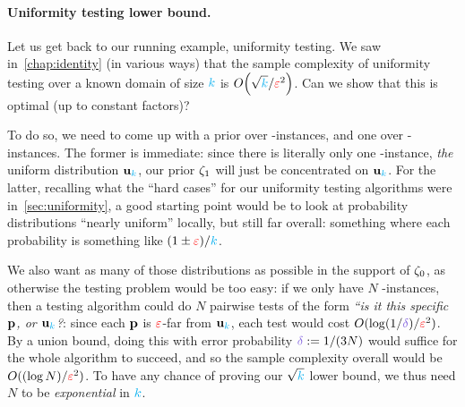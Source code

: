 \paragraph{Uniformity testing lower bound.} Let us get back to our running example, uniformity testing. We saw  in~\cref{chap:identity} (in various ways) that the sample complexity of uniformity testing over a known domain of size ${\textcolor{cyan}{k}}$ is $\bigO{\sqrt{\ab}/\dst^2}$. Can we show that this is optimal (up to constant factors)?

To do so, we need to come up with a prior over \yes-instances, and one over \no-instances. The former is immediate: since there is literally only one \yes-instance, \emph{the} uniform distribution $\mathbf{u}_{\textcolor{cyan}{k}}$, our prior $\zeta_1$ will just be concentrated on $\mathbf{u}_{\textcolor{cyan}{k}}$. For the latter, recalling what the ``hard cases'' for our uniformity testing algorithms were in~\cref{sec:uniformity}, a good starting point would be to look at probability distributions ``nearly uniform'' locally, but still far overall: something where each probability is something like $(1\pm\textcolor{red}{\varepsilon})/{\textcolor{cyan}{k}}$. 

We also want as many of those distributions as possible in the support of $\zeta_0$, as otherwise the testing problem would be too easy: if we only have $N$ \no-instances, then a testing algorithm could do $N$ pairwise tests of the form \emph{``is it this specific $\mathbf{p}$, or $\mathbf{u}_{\textcolor{cyan}{k}}$?}: since each $\mathbf{p}$ is $\textcolor{red}{\varepsilon}$-far from $\mathbf{u}_{\textcolor{cyan}{k}}$, each test would cost $O(\log(1/\errprob)/\dst^2)$. By a union bound, doing this with error probability $\errprob \eqdef 1/(3N)$ would suffice for the whole algorithm to succeed, and so the sample complexity overall would be $O((\log N)/\textcolor{red}{\varepsilon}^2)$. To have any chance of proving our $\sqrt{{\textcolor{cyan}{k}}}$ lower bound, we thus need $N$ to be \emph{exponential} in ${\textcolor{cyan}{k}}$.

